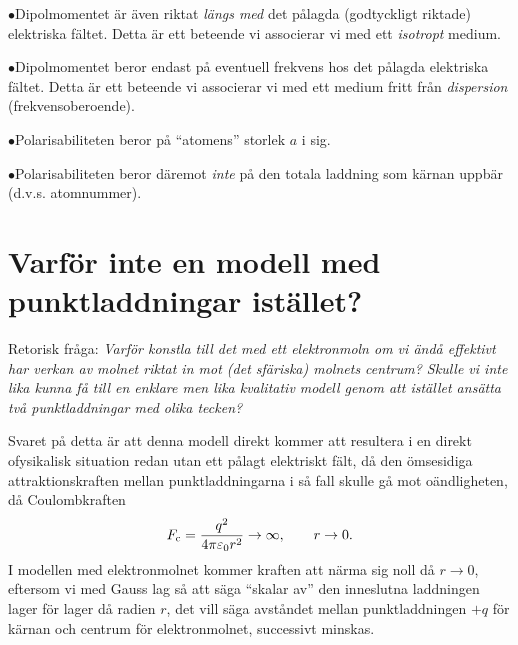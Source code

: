 \item{$\bullet$}{Dipolmomentet {\"a}r {\"a}ven riktat {\it l{\"a}ngs med} det
                 p{\aa}lagda (godtyckligt riktade) elektriska f{\"a}ltet.
                 Detta {\"a}r ett beteende vi associerar vi med ett
                 {\it isotropt} medium.}
\item{$\bullet$}{Dipolmomentet beror endast p{\aa} eventuell frekvens hos
                 det p{\aa}lagda elektriska f{\"a}ltet. Detta {\"a}r ett
                 beteende vi associerar vi med ett medium fritt fr{\aa}n
                 {\it dispersion} (frekvensoberoende).}
\item{$\bullet$}{Polarisabiliteten beror p{\aa} ``atomens''
                 storlek $a$ i sig.}
\item{$\bullet$}{Polarisabiliteten beror d{\"a}remot {\it inte} p{\aa} den
                 totala laddning som k{\"a}rnan uppb{\"a}r (d.v.s. atomnummer).
                 }
\medskip
\section{Varf{\"o}r inte en modell med punktladdningar ist{\"a}llet?}
Retorisk fr{\aa}ga: {\it Varf{\"o}r konstla till det med ett elektronmoln om vi
{\"a}nd{\aa} effektivt har verkan av molnet riktat in mot (det sf{\"a}riska)
molnets centrum? Skulle vi inte lika kunna f{\aa} till en enklare men lika
kvalitativ modell genom att ist{\"a}llet ans{\"a}tta tv{\aa} punktladdningar
med olika tecken?}

Svaret p{\aa} detta {\"a}r att denna modell direkt kommer att resultera i en
direkt ofysikalisk situa\-tion redan utan ett p{\aa}lagt elektriskt f{\"a}lt,
d{\aa} den {\"o}msesidiga attraktionskraften mellan punktladdningarna i s{\aa}
fall skulle g{\aa} mot o{\"a}ndligheten, d{\aa} Coulombkraften
$$
  F_{\rm c}={{q^2}\over{4\pi\varepsilon_0 r^2}}\to\infty,\qquad r\to 0.
$$
I modellen med elektronmolnet kommer kraften att n{\"a}rma sig noll d{\aa}
$r\to 0$, eftersom vi med Gauss lag s{\aa} att s{\"a}ga ``skalar av'' den
inneslutna laddningen lager f{\"o}r lager d{\aa} radien $r$, det vill s{\"a}ga
avst{\aa}ndet mellan punktladdningen $+q$ f{\"o}r k{\"a}rnan och centrum
f{\"o}r elektronmolnet, successivt minskas.
\vfill\eject

